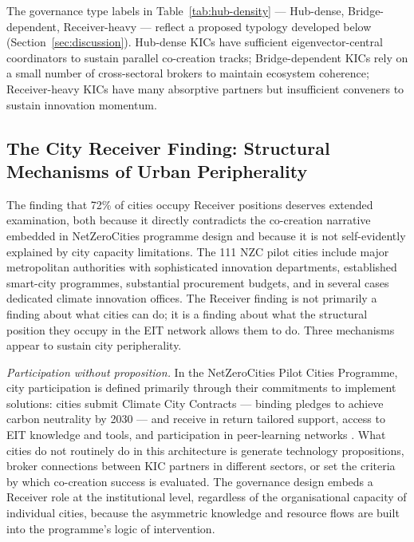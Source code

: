 \documentclass[review,12pt]{elsarticle}
\begin{document}
The governance type labels in Table~\ref{tab:hub-density} --- Hub-dense, Bridge-dependent, Receiver-heavy --- reflect a proposed typology developed below (Section~\ref{sec:discussion}). Hub-dense KICs have sufficient eigenvector-central coordinators to sustain parallel co-creation tracks; Bridge-dependent KICs rely on a small number of cross-sectoral brokers to maintain ecosystem coherence; Receiver-heavy KICs have many absorptive partners but insufficient conveners to sustain innovation momentum.

\subsection{The City Receiver Finding: Structural Mechanisms of Urban Peripherality}

The finding that 72\% of cities occupy Receiver positions deserves extended examination, both because it directly contradicts the co-creation narrative embedded in NetZeroCities programme design and because it is not self-evidently explained by city capacity limitations. The 111 NZC pilot cities include major metropolitan authorities with sophisticated innovation departments, established smart-city programmes, substantial procurement budgets, and in several cases dedicated climate innovation offices. The Receiver finding is not primarily a finding about what cities can do; it is a finding about what the structural position they occupy in the EIT network allows them to do. Three mechanisms appear to sustain city peripherality.

\textit{Participation without proposition.} In the NetZeroCities Pilot Cities Programme, city participation is defined primarily through their commitments to implement solutions: cities submit Climate City Contracts --- binding pledges to achieve carbon neutrality by 2030 --- and receive in return tailored support, access to EIT knowledge and tools, and participation in peer-learning networks \citep{nzc2022pilot}. What cities do not routinely do in this architecture is generate technology propositions, broker connections between KIC partners in different sectors, or set the criteria by which co-creation success is evaluated. The governance design embeds a Receiver role at the institutional level, regardless of the organisational capacity of individual cities, because the asymmetric knowledge and resource flows are built into the programme's logic of intervention.
\end{document}
